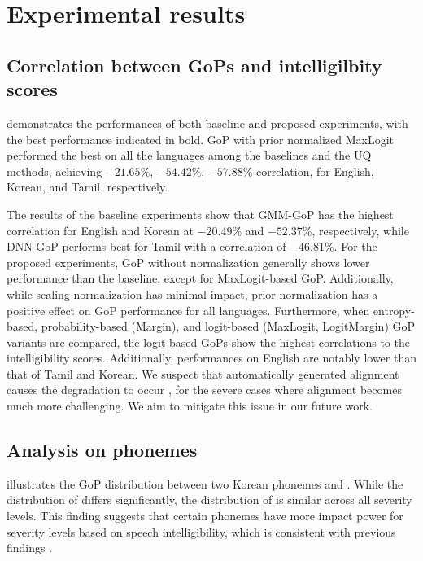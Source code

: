 
\section{Experimental results} \label{sec:results}
\subsection{Correlation between GoPs and intelligilbity scores}
 demonstrates the performances of both baseline and proposed experiments, with the best performance indicated in bold.
GoP with prior normalized MaxLogit performed the best on all the languages among the baselines and the UQ methods, achieving $-21.65\%$, $-54.42\%$, $-57.88\%$ correlation, for English, Korean, and Tamil, respectively.

The results of the baseline experiments show that GMM-GoP has the highest correlation for English and Korean at $-20.49\%$ and $-52.37\%$, respectively, while DNN-GoP performs best for Tamil with a correlation of $-46.81\%$.
For the proposed experiments, GoP without normalization generally shows lower performance than the baseline, except for MaxLogit-based GoP. 
Additionally, while scaling normalization has minimal impact, prior normalization has a positive effect on GoP performance for all languages. 
Furthermore, when entropy-based, probability-based (Margin), and logit-based (MaxLogit, LogitMargin) GoP variants are compared, the logit-based GoPs show the highest correlations to the intelligibility scores.
Additionally, performances on English are notably lower than that of Tamil and Korean.
We suspect that automatically generated alignment causes the degradation to occur \cite{mathad2021impact}, for the severe cases where alignment becomes much more challenging.
We aim to mitigate this issue in our future work.

% 

\subsection{Analysis on phonemes}
 illustrates the GoP distribution between two Korean phonemes  and .
While the distribution of  differs significantly, the distribution of  is similar across all severity levels.
This finding suggests that certain phonemes have more impact power for severity levels based on speech intelligibility, which is consistent with previous findings \cite{quintas2022automatic}.


